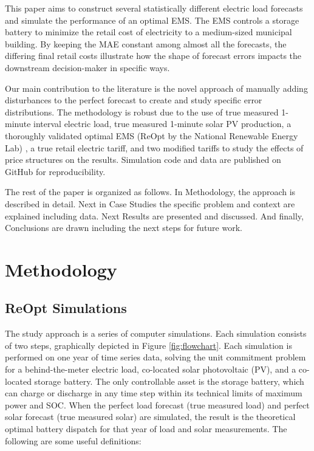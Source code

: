 \documentclass[conference]{IEEEtran}
\begin{document}

This paper aims to construct several statistically different electric load forecasts and simulate the performance of an optimal EMS. The EMS controls a storage battery to minimize the retail cost of electricity to a medium-sized municipal building. By keeping the MAE constant among almost all the forecasts, the differing final retail costs illustrate how the shape of forecast errors impacts the downstream decision-maker in specific ways.

Our main contribution to the literature is the novel approach of manually adding disturbances to the perfect forecast to create and study specific error distributions. The methodology is robust due to the use of true measured 1-minute interval electric load, true measured 1-minute solar PV production, a thoroughly validated optimal EMS (ReOpt by the National Renewable Energy Lab) \cite{b12}, a true retail electric tariff, and two modified tariffs to study the effects of price structures on the results. Simulation code and data are published on GitHub for reproducibility.

The rest of the paper is organized as follows. In Methodology, the approach is described in detail. Next in Case Studies the specific problem and context are explained including data. Next Results are presented and discussed. And finally, Conclusions are drawn including the next steps for future work.

\section{Methodology}

\subsection{ReOpt Simulations}

The study approach is a series of computer simulations. Each simulation consists of two steps, graphically depicted in Figure \ref{fig:flowchart}. Each simulation is performed on one year of time series data, solving the unit commitment problem for a behind-the-meter electric load, co-located solar photovoltaic (PV), and a co-located storage battery. The only controllable asset is the storage battery, which can charge or discharge in any time step within its technical limits of maximum power and SOC. When the perfect load forecast (true measured load) and perfect solar forecast (true measured solar) are simulated, the result is the theoretical optimal battery dispatch for that year of load and solar measurements. The following are some useful definitions:
\end{document}
